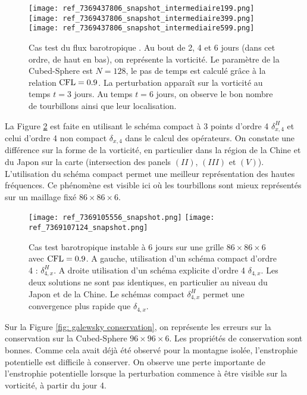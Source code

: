 \begin{figure}[htbp]
\begin{center}
\texttt{[image: ref\_7369437806\_snapshot\_intermediaire199.png]}
\texttt{[image: ref\_7369437806\_snapshot\_intermediaire399.png]}
\texttt{[image: ref\_7369437806\_snapshot\_intermediaire599.png]}
\end{center}
\caption{Cas test du flux barotropique \cite{Galewsky2004}. Au bout de 2, 4 et 6 jours (dans cet ordre, de haut en bas), on représente la vorticité. Le paramètre de la Cubed-Sphere est $N=128$, le pas de temps est calculé grâce à la relation $\text{CFL}=0.9$. La perturbation apparaît sur la vorticité au temps $t=3$ jours. Au temps $t=6$ jours, on observe le bon nombre de tourbillons ainsi que leur localisation.}
\label{fig: galewsky 246}
\end{figure}

La Figure \ref{fig: galewsky compact/explicite} est faite en utilisant le schéma compact à 3 points d'ordre 4 $\delta_{x,4}^H$ et celui d'ordre 4 non compact $\delta_{x,4}$ dans le calcul des opérateurs. On constate une différence sur la forme de la vorticité, en particulier dans la région de la Chine et du Japon sur la carte (intersection des panels $(II)$, $(III)$ et $(V)$). L'utilisation du schéma compact permet une meilleur représentation des hautes fréquences. Ce phénomène est visible ici où les tourbillons sont mieux représentés sur un maillage fixé $86 \times 86 \times 6$.

\begin{figure}[htbp]
\begin{center}
\texttt{[image: ref\_7369105556\_snapshot.png]}
\texttt{[image: ref\_7369107124\_snapshot.png]}
\end{center}
\caption{Cas test barotropique instable \cite{Galewsky2004} à 6 jours sur une grille $86 \times 86 \times 6$ avec $\text{CFL}=0.9$. A gauche, utilisation d'un schéma compact d'ordre 4 : $\delta_{4,x}^H$. A droite utilisation d'un schéma explicite d'ordre 4 $\delta_{4,x}$. Les deux solutions ne sont pas identiques, en particulier au niveau du Japon et de la Chine. Le schémas compact $\delta_{4,x}^H$ permet une convergence plus rapide que $\delta_{4,x}$.}
\label{fig: galewsky compact/explicite}
\end{figure}

Sur la Figure \ref{fig: galewsky conservation}, on représente les erreurs sur la conservation sur la Cubed-Sphere $96 \times 96 \times 6$. Les propriétés de conservation sont bonnes.  Comme cela avait déjà été observé pour la montagne isolée, l'enstrophie potentielle est difficile à conserver. On observe une perte importante de l'enstrophie potentielle lorsque la perturbation commence à être visible sur la vorticité, à partir du jour 4.

